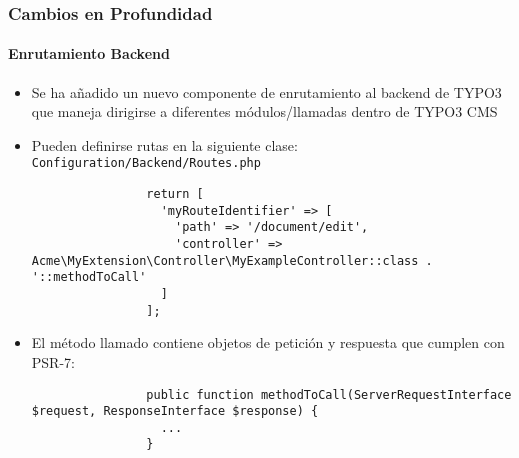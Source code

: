 \begin{frame}[fragile]
	\frametitle{Cambios en Profundidad}
	\framesubtitle{Enrutamiento Backend}

	\lstset{basicstyle=\tiny\ttfamily}

	\begin{itemize}

		\item Se ha añadido un nuevo componente de enrutamiento al backend de TYPO3 que maneja
			dirigirse a diferentes módulos/llamadas dentro de TYPO3 CMS

		\item Pueden definirse rutas en la siguiente clase:\newline
			\small
				\texttt{Configuration/Backend/Routes.php}
			\normalsize

			\begin{lstlisting}
				return [
				  'myRouteIdentifier' => [
				    'path' => '/document/edit',
				    'controller' => Acme\MyExtension\Controller\MyExampleController::class . '::methodToCall'
				  ]
				];
			\end{lstlisting}

		\item El método llamado contiene objetos de petición y respuesta que cumplen con PSR-7:

			\begin{lstlisting}
				public function methodToCall(ServerRequestInterface $request, ResponseInterface $response) {
				  ...
				}
			\end{lstlisting}

	\end{itemize}

\end{frame}


